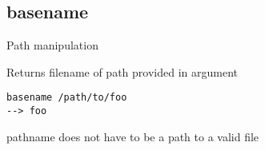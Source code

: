 \subsection{basename}

\begin{frame}[fragile]{Path manipulation}
  \begin{exampleblock}{Returns filename of path provided in argument}
    \begin{lstlisting}[showstringspaces=false]
basename /path/to/foo
--> foo
    \end{lstlisting}
  \end{exampleblock}
  \pause
pathname does not have to be a path to a valid file
\end{frame}

